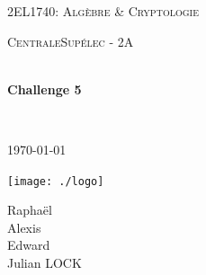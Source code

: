 \begin{titlepage}
\begin{center}


\LARGE \textsc{2EL1740: Algèbre \& Cryptologie}

\vspace{0.2cm}

\Large \textsc{CentraleSupélec - 2A}

\vspace{0.3cm}

\HRule \\[0.4cm]

{\huge \bfseries Challenge 5\\
[0.2cm]}

\HRule \\[0.4cm]

\vspace{2cm}

\textsc{\today}

\vspace{2cm}

\texttt{[image: ./logo]}~\\[3cm]

\begin{minipage}{0.4\textwidth}
\begin{spacing}{1.125}
\begin{center}
    Raphaël \\
    Alexis \\
    Edward \\
    Julian \textsc{LOCK}
\end{center}
\end{spacing}
\end{minipage}

\vfill

\end{center}
\end{titlepage}